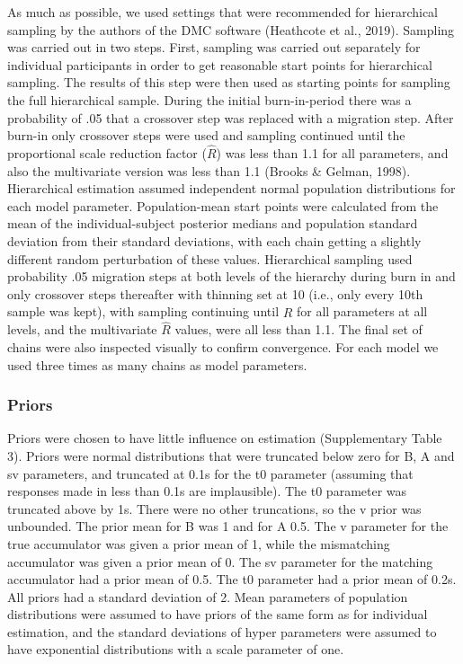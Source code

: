 \documentclass[
  english,
  man,floatsintext]{apa6}
\begin{document}
As much as possible, we used settings that were recommended for hierarchical sampling by the authors of the DMC software (Heathcote et al., 2019). Sampling was carried out in two steps. First, sampling was carried out separately for individual participants in order to get reasonable start points for hierarchical sampling. The results of this step were then used as starting points for sampling the full hierarchical sample. During the initial burn-in-period there was a probability of .05 that a crossover step was replaced with a migration step. After burn-in only crossover steps were used and sampling continued until the proportional scale reduction factor (\(\hat{R}\)) was less than 1.1 for all parameters, and also the multivariate version was less than 1.1 (Brooks \& Gelman, 1998). Hierarchical estimation assumed independent normal population distributions for each model parameter. Population-mean start points were calculated from the mean of the individual-subject posterior medians and population standard deviation from their standard deviations, with each chain getting a slightly different random perturbation of these values. Hierarchical sampling used probability .05 migration steps at both levels of the hierarchy during burn in and only crossover steps thereafter with thinning set at 10 (i.e., only every 10th sample was kept), with sampling continuing until \(\hat{R}\) for all parameters at all levels, and the multivariate \(\hat{R}\) values, were all less than 1.1. The final set of chains were also inspected visually to confirm convergence. For each model we used three times as many chains as model parameters.

\subsubsection{Priors}\label{priors}

Priors were chosen to have little influence on estimation (Supplementary Table 3). Priors were normal distributions that were truncated below zero for B, A and sv parameters, and truncated at 0.1s for the t0 parameter (assuming that responses made in less than 0.1s are implausible). The t0 parameter was truncated above by 1s. There were no other truncations, so the v prior was unbounded. The prior mean for B was 1 and for A 0.5. The v parameter for the true accumulator was given a prior mean of 1, while the mismatching accumulator was given a prior mean of 0. The sv parameter for the matching accumulator had a prior mean of 0.5. The t0 parameter had a prior mean of 0.2s. All priors had a standard deviation of 2. Mean parameters of population distributions were assumed to have priors of the same form as for individual estimation, and the standard deviations of hyper parameters were assumed to have exponential distributions with a scale parameter of one.
\end{document}

